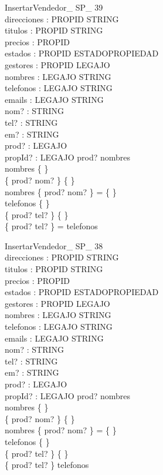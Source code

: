 \documentclass[12pt]{article}
\begin{document}
\begin{schema}{InsertarVendedor\_ SP\_ 39}\\
 direcciones : PROPID \pfun STRING \\
 titulos : PROPID \pfun STRING \\
 precios : PROPID \pfun \nat \\
 estados : PROPID \pfun ESTADOPROPIEDAD \\
 gestores : PROPID \pfun LEGAJO \\
 nombres : LEGAJO \pfun STRING \\
 telefonos : LEGAJO \pfun STRING \\
 emails : LEGAJO \pfun STRING \\
 nom? : STRING \\
 tel? : STRING \\
 em? : STRING \\
 prod? : LEGAJO \\
 propId? : LEGAJO 
\where
 prod? \notin \dom nombres \\
 nombres \neq \{ \} \\
 \{ prod? \mapsto nom? \} \neq \{ \} \\
 nombres \cap \{ prod? \mapsto nom? \} = \{ \} \\
 telefonos \neq \{ \} \\
 \{ prod? \mapsto tel? \} \neq \{ \} \\
 \{ prod? \mapsto tel? \} = telefonos
\end{schema}

\begin{schema}{InsertarVendedor\_ SP\_ 38}\\
 direcciones : PROPID \pfun STRING \\
 titulos : PROPID \pfun STRING \\
 precios : PROPID \pfun \nat \\
 estados : PROPID \pfun ESTADOPROPIEDAD \\
 gestores : PROPID \pfun LEGAJO \\
 nombres : LEGAJO \pfun STRING \\
 telefonos : LEGAJO \pfun STRING \\
 emails : LEGAJO \pfun STRING \\
 nom? : STRING \\
 tel? : STRING \\
 em? : STRING \\
 prod? : LEGAJO \\
 propId? : LEGAJO 
\where
 prod? \notin \dom nombres \\
 nombres \neq \{ \} \\
 \{ prod? \mapsto nom? \} \neq \{ \} \\
 nombres \cap \{ prod? \mapsto nom? \} = \{ \} \\
 telefonos \neq \{ \} \\
 \{ prod? \mapsto tel? \} \neq \{ \} \\
 \{ prod? \mapsto tel? \} \subset telefonos
\end{schema}
\end{document}
